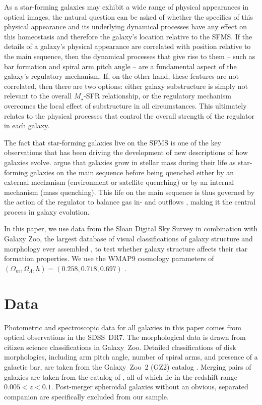\documentclass[useAMS,usenatbib]{mn2e}
\begin{document}
As a star-forming galaxies may exhibit a wide range of physical appearances in optical images, the natural question can be asked of whether the specifics of this physical appearance and its underlying dynamical processes have any effect on this homeostasis and therefore the galaxy's location relative to the SFMS. If the details of a galaxy's physical appearance are correlated with position relative to the main sequence, then the dynamical processes that give rise to them -- such as bar formation and spiral arm pitch angle -- are a fundamental aspect of the galaxy's regulatory mechanism. If, on the other hand, these features are not correlated, then there are two options: either galaxy substructure is simply not relevant to the overall $M_\star$-SFR relationship, or the regulatory mechanism overcomes the local effect of substructure in all circumstances. This ultimately relates to the physical processes that control the overall strength of the regulator in each galaxy.

The fact that star-forming galaxies live on the SFMS is one of the key observations that has been driving the development of new descriptions of how galaxies evolve. \citet{pen10a,pen12} argue that galaxies grow in stellar mass during their life as star-forming galaxies on the main sequence before being quenched either by an external mechanism (environment or satellite quenching) or by an internal mechanism (mass quenching). This life on the main sequence is thus governed by the action of the regulator to balance gas in- and outflows \citep{lil13}, making it the central process in galaxy evolution.

In this paper, we use data from the Sloan Digital Sky Survey \citep[SDSS;][]{yor00,str02,aba09} in combination with Galaxy Zoo, the largest database of visual classifications of galaxy structure and morphology ever assembled \citep{lin08,lin11,wil13}, to test whether galaxy structure affects their star formation properties. We use the WMAP9 cosmology parameters of $(\Omega_m,\Omega_\Lambda,h)=(0.258,0.718,0.697)$ \citep{hin13}.


\section{Data} \label{sec-data}

Photometric and spectroscopic data for all galaxies in this paper comes from optical observations in the SDSS~DR7. The morphological data is drawn from citizen science classifications in Galaxy~Zoo. Detailed classifications of disk morphologies, including arm pitch angle, number of spiral arms, and presence of a galactic bar, are taken from the Galaxy~Zoo~2 (GZ2) catalog \citep{wil13}. Merging pairs of galaxies are taken from the catalog of \citet{dar10a}, all of which lie in the redshift range $0.005<z<0.1$. Post-merger spheroidal galaxies without an obvious, separated companion are specifically excluded from our sample.
\end{document}
